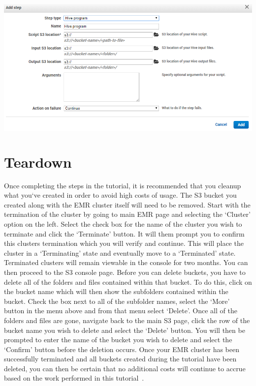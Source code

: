 \centering\includegraphics[width=\columnwidth]{../images/emr_cluster_steps2.png}

\section{Teardown}

Once completing the steps in the tutorial, it is recommended that you cleanup 
what you`ve created in order to avoid high costs of usage. The S3 bucket you 
created along with the EMR cluster itself will need to be removed. Start with 
the termination of the cluster by going to main EMR page and selecting the 
`Cluster' option on the left. Select the check box for the name of the cluster 
you wish to terminate and click the `Terminate' button. It will them prompt 
you to confirm this clusters termination which you will verify and continue. 
This will place the cluster in a `Terminating' state and eventually move to 
a `Terminated' state. Terminated clusters will remain viewable in the console 
for two months. You can then proceed to the S3 console page. Before you can 
delete buckets, you have to delete all of the folders and files contained 
within that bucket. To do this, click on the bucket name which will then show 
the subfolders contained within the bucket. Check the box next to all of the 
subfolder names, select the `More' button in the menu above and from that 
menu select `Delete'. Once all of the folders and files are gone, navigate 
back to the main S3 page, click the row of the bucket name you wish to delete 
and select the `Delete' button. You will then be prompted to enter the name 
of the bucket you wish to delete and select the `Confirm' button before the 
deletion occurs. Once your EMR cluster has been successfully terminated and 
all buckets created during the tutorial have been deleted, you can then be 
certain that no additional costs will continue to accrue based on the work 
performed in this tutorial~\cite{hid-sp18-521-emrreset}.  


